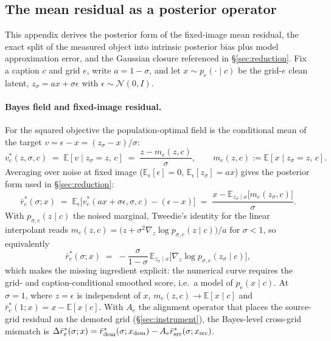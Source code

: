 \subsection{The mean residual as a posterior operator}
\label{app:posterior}

This appendix derives the posterior form of the fixed-image mean
residual, the exact split of the measured object into intrinsic
posterior bias plus model approximation error, and the Gaussian
closure referenced in \S\ref{sec:reduction}. Fix a caption $c$ and
grid $e$, write $a = 1 - \sigma$, and let $x \sim p_e(\cdot \mid c)$
be the grid-$e$ clean latent, $z_\sigma = a x + \sigma \epsilon$ with
$\epsilon \sim \mathcal{N}(0, I)$.

\paragraph{Bayes field and fixed-image residual.}
For the squared objective the population-optimal field is the
conditional mean of the target
$v = \epsilon - x = (z_\sigma - x)/\sigma$:
\begin{equation}
v_e^{*}(z, \sigma, c)
\;=\; \mathbb{E}[v \mid z_\sigma = z,\, c]
\;=\; \frac{z - m_e(z, c)}{\sigma},
\qquad
m_e(z, c) := \mathbb{E}[x \mid z_\sigma = z,\, c].
\label{eq:appbayesfield}
\end{equation}
Averaging over noise at fixed image
($\mathbb{E}_\epsilon[\epsilon] = 0$,
$\mathbb{E}_\epsilon[z_\sigma] = a x$) gives the posterior form
used in \S\ref{sec:reduction}:
\begin{equation}
\bar r_e^{*}(\sigma; x)
\;=\; \mathbb{E}_\epsilon\big[v_e^{*}(a x + \sigma \epsilon, \sigma, c)
      - (\epsilon - x)\big]
\;=\; \frac{x - \mathbb{E}_{z_\sigma \mid x}\big[m_e(z_\sigma,
      c)\big]}{\sigma}.
\label{eq:appposterior}
\end{equation}
With $p_{\sigma,e}(z \mid c)$ the noised marginal, Tweedie's identity
for the linear interpolant reads
$m_e(z, c) = \big(z + \sigma^2 \nabla_z \log p_{\sigma,e}(z \mid
c)\big)/a$ for $\sigma < 1$, so equivalently
\begin{equation}
\bar r_e^{*}(\sigma; x)
\;=\; -\frac{\sigma}{1 - \sigma}\,
\mathbb{E}_{z_\sigma \mid x}\big[\nabla_z \log
p_{\sigma,e}(z_\sigma \mid c)\big],
\label{eq:appscore}
\end{equation}
which makes the missing ingredient explicit: the numerical curve
requires the grid- and caption-conditional smoothed score, i.e.\ a
model of $p_e(x \mid c)$. At $\sigma = 1$, where $z = \epsilon$ is
independent of $x$, $m_e(z, c) \to \mathbb{E}[x \mid c]$ and
$\bar r_e^{*}(1; x) = x - \mathbb{E}[x \mid c]$. With $A_e$ the
alignment operator that places the source-grid residual on the demoted
grid (\S\ref{sec:instrument}), the Bayes-level cross-grid mismatch is
$\Delta \bar r_e^{*}(\sigma; x) = \bar
r_{\mathrm{dem}}^{*}(\sigma; x_{\mathrm{dem}}) - A_e \bar r_{\mathrm{src}}^{*}(\sigma;
x_{\mathrm{src}})$.

